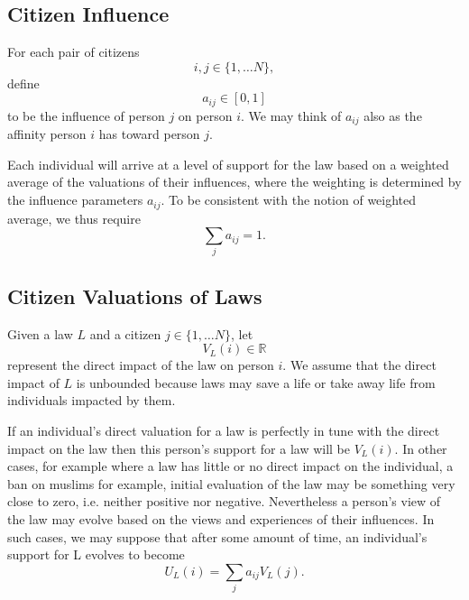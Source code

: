 \subsection {Citizen Influence}
For each pair of citizens $$i,j\in\{1,\dots N\},$$ define $$a_{ij}\in [0,1]$$ to be the influence of person $j$ on person $i$.  We may think of $a_{ij}$ also as the affinity person $i$ has toward person $j$. 


Each individual will arrive at a level of support for the law based on a weighted average of the valuations of their influences, where the weighting is determined by the influence parameters $a_{ij}$. To be consistent with the notion of weighted average, we thus require $$\sum_ja_{ij}=1.$$%

\subsection{Citizen Valuations of Laws}
Given a law $L$ and a citizen $j\in\{1,\dots N\}$, %
let $$V_L(i)\in\mathbb{R}$$ represent the direct impact of the law on person $i$. We assume that the direct impact of $L$ is unbounded because laws may save a life or take away life from individuals impacted by them.

If an individual's direct valuation for a law is perfectly in tune with the direct impact on the law then this person's support for a law will be $V_L(i)$. %
In other cases, for example where a law has little or no direct impact on the individual, a ban on muslims for example, initial evaluation of the law may be something very close to zero, i.e. neither positive nor negative.  Nevertheless a person's view of the law may evolve based on the views and experiences of their influences.  In such cases, we may suppose that after some amount of time, an individual's support for L evolves to become $$U_L(i)=\sum_ja_{ij}V_L(j).$$


